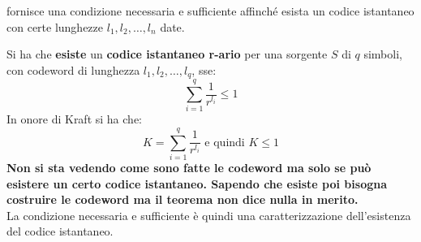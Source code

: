 \documentclass[a4paper,12pt, oneside]{book}
\begin{document}
fornisce una condizione necessaria e sufficiente affinché esista un codice
istantaneo con certe lunghezze $l_1,l_2,\ldots,l_n$ date.
\begin{teorema}
  Si ha che \textbf{esiste} un \textbf{codice istantaneo r-ario} per una
  sorgente $S$ di $q$ simboli, con codeword di lunghezza $l_1,l_2,\ldots,l_q$,
  sse: 
  \[\sum_{i=1}^q\frac{1}{r^{l_i}}\leq 1\]
  In onore di Kraft si ha che:
  \[K=\sum_{i=1}^q\frac{1}{r^{l_i}} \mbox{ e quindi } K\leq 1\]
  \textbf{Non si sta vedendo come sono fatte le codeword ma solo se può esistere
    un certo codice istantaneo. Sapendo che esiste poi bisogna costruire le
    codeword ma il teorema non dice nulla in merito.}\\
  La condizione necessaria e sufficiente è quindi una caratterizzazione
  dell'esistenza del codice istantaneo.
\end{teorema}
\end{document}
